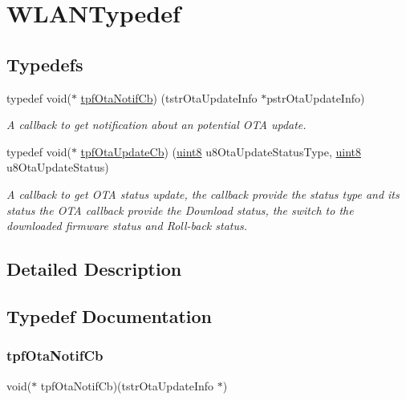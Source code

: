 \hypertarget{group__OTATYPEDEF}{}\section{W\+L\+A\+N\+Typedef}
\label{group__OTATYPEDEF}
\subsection*{Typedefs}
\begin{DoxyCompactItemize}
\item 
typedef void($\ast$ \hyperlink{group__OTATYPEDEF_gaa3fadd9ab95ba91a4f32c702dd5104d8}{tpf\+Ota\+Notif\+Cb}) (tstr\+Ota\+Update\+Info $\ast$pstr\+Ota\+Update\+Info)
\begin{DoxyCompactList}\small\item\em A callback to get notification about an potential O\+TA update. \end{DoxyCompactList}\item 
typedef void($\ast$ \hyperlink{group__OTATYPEDEF_ga86bdacc22dca0d0844e0825d81fb4f85}{tpf\+Ota\+Update\+Cb}) (\hyperlink{group__DataT_ga4df709a77647e870bbf1d955b8edc9a6}{uint8} u8\+Ota\+Update\+Status\+Type, \hyperlink{group__DataT_ga4df709a77647e870bbf1d955b8edc9a6}{uint8} u8\+Ota\+Update\+Status)
\begin{DoxyCompactList}\small\item\em A callback to get O\+TA status update, the callback provide the status type and its status the O\+TA callback provide the Download status, the switch to the downloaded firmware status and Roll-\/back status. \end{DoxyCompactList}\end{DoxyCompactItemize}


\subsection{Detailed Description}


\subsection{Typedef Documentation}
\mbox{\label{group__OTATYPEDEF_gaa3fadd9ab95ba91a4f32c702dd5104d8}} 
\subsubsection{\texorpdfstring{tpf\+Ota\+Notif\+Cb}{tpfOtaNotifCb}}
{\footnotesize\ttfamily void($\ast$ tpf\+Ota\+Notif\+Cb)(tstr\+Ota\+Update\+Info $\ast$)}



